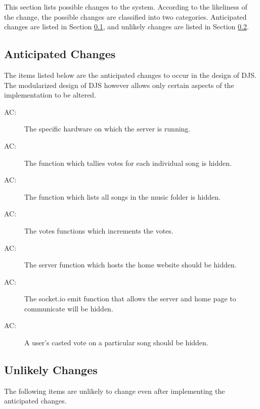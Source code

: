 \documentclass[12pt, titlepage]{article}
\newcounter{acnum}
\newcommand{\actheacnum}{AC\theacnum}
\begin{document}
This section lists possible changes to the system. According to the likeliness
of the change, the possible changes are classified into two
categories. Anticipated changes are listed in Section \ref{SecAchange}, and
unlikely changes are listed in Section \ref{SecUchange}.


\subsection{Anticipated Changes} \label{SecAchange}


The items listed below are the anticipated changes to occur in the design of DJS. The modularized design of DJS however allows only certain aspects of the implementation to be altered.


\begin{description}
\item[ \actheacnum \label{ac1}:] The specific hardware on which the server is running.
\item[ \actheacnum \label{ac2}:] The function which tallies votes for each individual song is hidden.
\item[ \actheacnum \label{ac3}:] The function which lists all songs in the music folder is hidden.
\item[ \actheacnum \label{ac4}:] The votes functions which increments the votes.  
\item[ \actheacnum \label{ac5}:] The server function which hosts the home website should be hidden.
\item[ \actheacnum \label{ac6}:] The socket.io emit function that allows the server and home page to communicate will be hidden.
\item[ \actheacnum \label{ac7}:] A user's casted vote on a particular song should be hidden.
\end{description}


\subsection{Unlikely Changes} \label{SecUchange}
The following items are unlikely to change even after implementing the anticipated changes.
\end{document}
